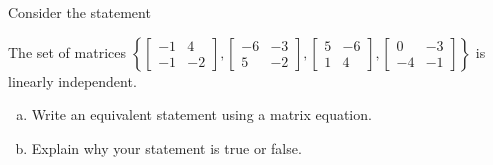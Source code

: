 
\begin{exerciseStatement}


Consider the statement 
\begin{center}\begin{minipage}{0.8\textwidth}
 The set of matrices \( \left\{ \left[\begin{array}{cc}
-1 & 4 \\
-1 & -2
\end{array}\right] , \left[\begin{array}{cc}
-6 & -3 \\
5 & -2
\end{array}\right] , \left[\begin{array}{cc}
5 & -6 \\
1 & 4
\end{array}\right] , \left[\begin{array}{cc}
0 & -3 \\
-4 & -1
\end{array}\right] \right\} \) is linearly independent.
\end{minipage}\end{center}
    


\begin{enumerate}[(a)]
\item  Write an equivalent statement using a matrix equation.
\item  Explain why your statement is true or false.
\end{enumerate}
    
\end{exerciseStatement}
    
